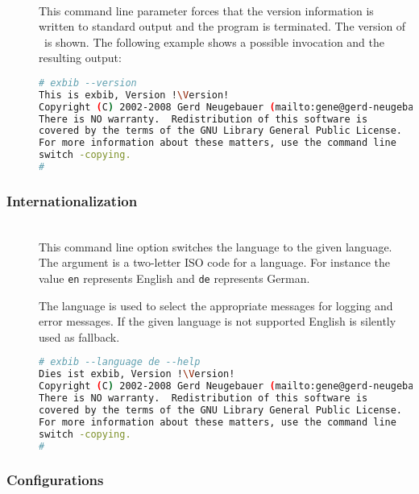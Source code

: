 \begin{description}
\item[]\ \\
  This command line parameter forces that the version information is
  written to standard output and the program is
  terminated. The version of \ExBib\ is shown. The
  following example shows a possible invocation and the resulting
  output:
\begin{lstlisting}[language=sh,escapechar=!]
# exbib --version
This is exbib, Version !\Version!
Copyright (C) 2002-2008 Gerd Neugebauer (mailto:gene@gerd-neugebauer.de).
There is NO warranty.  Redistribution of this software is
covered by the terms of the GNU Library General Public License.
For more information about these matters, use the command line
switch -copying.
#
\end{lstlisting}
\end{description}


\subsubsection{Internationalization}

\begin{description}
\item[ ]
\item[ ]\ \\
  This command line option switches the language to the given
  language. The argument is a two-letter ISO code for a language. For
  instance the value \texttt{en} represents English and \texttt{de}
  represents German.

  The language is used to select the appropriate messages for logging
  and error messages. If the given language is not supported English
  is silently used as fallback.
\begin{lstlisting}[language=sh,escapechar=!]
# exbib --language de --help
Dies ist exbib, Version !\Version!
Copyright (C) 2002-2008 Gerd Neugebauer (mailto:gene@gerd-neugebauer.de).
There is NO warranty.  Redistribution of this software is
covered by the terms of the GNU Library General Public License.
For more information about these matters, use the command line
switch -copying.
#
\end{lstlisting}
\end{description}


\subsubsection{Configurations}%
\label{sec:cli.cfg}%

